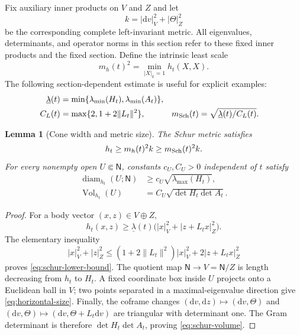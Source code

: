 \documentclass[10pt,a4paper]{article}
\numberwithin{equation}{section}
\newtheorem{lemma}[theorem]{Lemma}
\theoremstyle{definition}
\theoremstyle{remark}
\newcommand{\dd}{\mathrm d}
\newcommand{\diam}{\operatorname{diam}}
\newcommand{\Vol}{\operatorname{Vol}}
\begin{document}
Fix auxiliary inner products on $V$ and $Z$ and let
\begin{equation}
 k=|\dd v|_V^2+|\Theta|_Z^2
 \label{eq:auxiliary-metric}
\end{equation}
be the corresponding complete left-invariant metric.  All eigenvalues,
determinants, and operator norms in this section refer to these fixed inner
products and the fixed section.  Define the intrinsic least scale
\begin{equation}
 m_h(t)^2=\min_{|X|_k=1}h_t(X,X).
 \label{eq:intrinsic-scale}
\end{equation}
The following section-dependent estimate is useful for explicit examples:
\begin{equation}
\begin{aligned}
 \underline\lambda(t)&=
 \min\{\lambda_{\min}(H_t),\lambda_{\min}(A_t)\},\\
 C_L(t)&=\max\{2,1+2\|L_t\|^2\},&
 m_{\rm Sch}(t)&=\sqrt{\underline\lambda(t)/C_L(t)}.
\end{aligned}
 \label{eq:m-schur}
\end{equation}

\begin{lemma}[Cone width and metric size]
\label{lem:schur-size}
The Schur metric satisfies
\begin{equation}
 h_t\ge m_h(t)^2k\ge m_{\rm Sch}(t)^2k.
 \label{eq:schur-lower-bound}
\end{equation}
For every nonempty open $U\Subset\mathsf N$, constants $c_U,C_U>0$
independent of $t$ satisfy
\begin{align}
 \diam_{h_t}(U;\mathsf N)&\ge
 c_U\sqrt{\lambda_{\max}(H_t)},
 \label{eq:horizontal-size}\\
 \Vol_{h_t}(U)&=C_U\sqrt{\det H_t\det A_t}.
 \label{eq:schur-volume}
\end{align}
\end{lemma}

\begin{proof}
For a body vector $(x,z)\in V\oplus Z$,
\[
 h_t(x,z)\ge\underline\lambda(t)
 \bigl(|x|_V^2+|z+L_tx|_Z^2\bigr).
\]
The elementary inequality
\[
 |x|_V^2+|z|_Z^2
 \le(1+2\|L_t\|^2)|x|_V^2+2|z+L_tx|_Z^2
\]
proves \eqref{eq:schur-lower-bound}.  The quotient map
$\mathsf N\to V=\mathsf N/Z$ is length decreasing from $h_t$ to $H_t$.
A fixed coordinate box inside $U$ projects onto a Euclidean ball in $V$;
two points separated in a maximal-eigenvalue direction give
\eqref{eq:horizontal-size}.  Finally, the coframe changes
$(\dd v,\dd z)\mapsto(\dd v,\Theta)$ and
$(\dd v,\Theta)\mapsto(\dd v,\Theta+L_t\dd v)$ are triangular with
determinant one.  The Gram determinant is therefore
$\det H_t\det A_t$, proving \eqref{eq:schur-volume}.
\end{proof}
\end{document}
